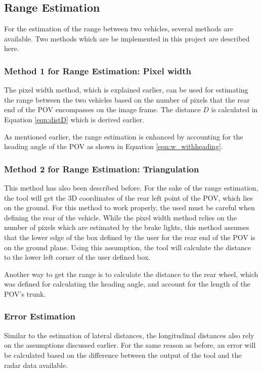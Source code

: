\subsection{Range Estimation}
For the estimation of the range between two vehicles, several methods are available. Two methods which are be implemented in this project are described here.

\subsubsection{Method 1 for Range Estimation: Pixel width}
The pixel width method, which is explained earlier, can be used for estimating the range between the two vehicles based on the number of pixels that the rear end of the POV encompasses on the image frame. The distance $D$ is calculated in Equation \ref{eqn:distD} which is derived earlier.

As mentioned earlier, the range estimation is enhanced by accounting for the heading angle of the POV as shown in Equation \ref{eqn:w_withheading}.

\subsubsection{Method 2 for Range Estimation: Triangulation}
This method has also been described before. For the sake of the range estimation, the tool will get the 3D coordinates of the rear left point of the POV, which lies on the ground. For this method to work properly, the used must be careful when defining the rear of the vehicle. While the pixel width method relies on the number of pixels which are estimated by the brake lights, this method assumes that the lower edge of the box defined by the user for the rear end of the POV is on the ground plane. Using this assumption, the tool will calculate the distance to the lower left corner of the user defined box.

Another way to get the range is to calculate the distance to the rear wheel, which was defined for calculating the heading angle, and account for the length of the POV's trunk.


\subsubsection{Error Estimation}
Similar to the estimation of lateral distances, the longitudinal distances also rely on the assumptions discussed earlier. For the same reason as before, an error will be calculated based on the difference between the output of the tool and the radar data available.